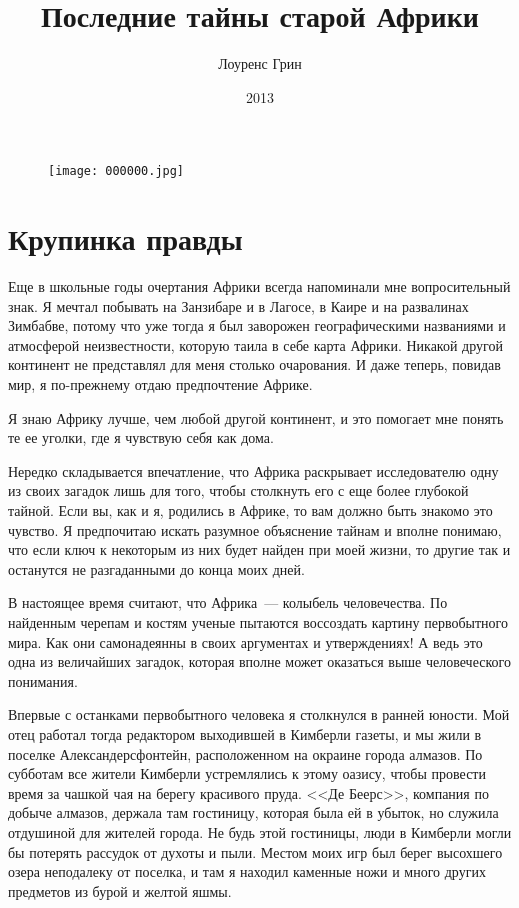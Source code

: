 \documentclass[12pt,a4paper,twoside,openany,svgnames]{memoir}
\author{Лоуренс Грин} %
\title{Последние тайны старой Африки}
\date{2013}
\begin{document}
\maketitle

\begin{figure}[ht!]
\centering
\texttt{[image: 000000.jpg]}
\label{overflow}
\end{figure}

\cleardoublepage


\chapter{Крупинка правды}

Еще в школьные годы очертания Африки всегда напоминали мне вопросительный знак. Я мечтал побывать на Занзибаре и в Лагосе, в Каире и на развалинах Зимбабве, потому что уже тогда я был заворожен географическими названиями и атмосферой неизвестности, которую таила в себе карта Африки. Никакой другой континент не представлял для меня столько очарования. И даже теперь, повидав мир, я по-прежнему отдаю предпочтение Африке.

Я знаю Африку лучше, чем любой другой континент, и это помогает мне понять те ее уголки, где я чувствую себя как дома.

Нередко складывается впечатление, что Африка раскрывает исследователю одну из своих загадок лишь для того, чтобы столкнуть его с еще более глубокой тайной. Если вы, как и я, родились в Африке, то вам должно быть знакомо это чувство. Я предпочитаю искать разумное объяснение тайнам и вполне понимаю, что если ключ к некоторым из них будет найден при моей жизни, то другие так и останутся не разгаданными до конца моих дней.

В настоящее время считают, что Африка~--- колыбель человечества. По найденным черепам и костям ученые пытаются воссоздать картину первобытного мира. Как они самонадеянны в своих аргументах и утверждениях! А ведь это одна из величайших загадок, которая вполне может оказаться выше человеческого понимания.

Впервые с останками первобытного человека я столкнулся в ранней юности. Мой отец работал тогда редактором выходившей в Кимберли газеты, и мы жили в поселке Александерсфонтейн, расположенном на окраине города алмазов. По субботам все жители Кимберли устремлялись к этому оазису, чтобы провести время за чашкой чая на берегу красивого пруда. <<Де Беерс>>, компания по добыче алмазов, держала там гостиницу, которая была ей в убыток, но служила отдушиной для жителей города. Не будь этой гостиницы, люди в Кимберли могли бы потерять рассудок от духоты и пыли. Местом моих игр был берег высохшего озера неподалеку от поселка, и там я находил каменные ножи и много других предметов из бурой и желтой яшмы.
\end{document}
